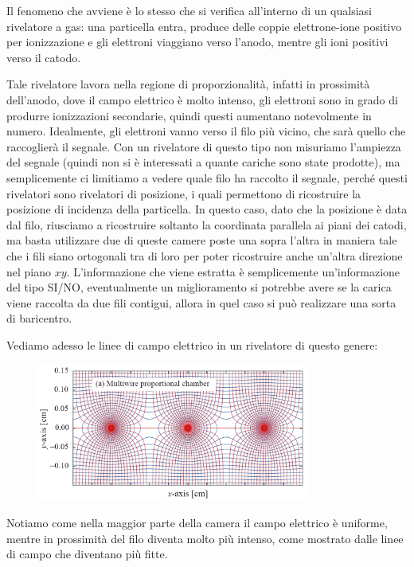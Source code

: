 \vspace{0.4cm}Il fenomeno che avviene è lo stesso che si verifica all'interno di un qualsiasi rivelatore a gas: una particella entra, produce delle coppie elettrone-ione positivo per ionizzazione e gli elettroni viaggiano verso l'anodo, mentre gli ioni positivi verso il catodo.

Tale rivelatore lavora nella regione di proporzionalità, infatti in prossimità dell'anodo, dove il campo elettrico è molto intenso, gli elettroni sono in grado di produrre ionizzazioni secondarie, quindi questi aumentano notevolmente in numero. Idealmente, gli elettroni vanno verso il filo più vicino, che sarà quello che raccoglierà il segnale. Con un rivelatore di questo tipo non misuriamo l'ampiezza del segnale (quindi non si è interessati a quante cariche sono state prodotte), ma semplicemente ci limitiamo a vedere quale filo ha raccolto il segnale, perché questi rivelatori sono rivelatori di posizione, i quali permettono di ricostruire la posizione di incidenza della particella. In questo caso, dato che la posizione è data dal filo, riusciamo a ricostruire soltanto la coordinata parallela ai piani dei catodi, ma basta utilizzare due di queste camere poste una sopra l'altra in maniera tale che i fili siano ortogonali tra di loro per poter ricostruire anche un'altra direzione nel piano $xy$. L'informazione che viene estratta è semplicemente un'informazione del tipo SI/NO, eventualmente un miglioramento si potrebbe avere se la carica viene raccolta da due fili contigui, allora in quel caso si può realizzare una sorta di baricentro.

Vediamo adesso le linee di campo elettrico in un rivelatore di questo genere:

\begin{figure}[H]
   \centering
   \includegraphics[width=0.8\textwidth]{immagini/campo_elettrico_MWPC.png}
\end{figure}

Notiamo come nella maggior parte della camera il campo elettrico è uniforme, mentre in prossimità del filo diventa molto più intenso, come mostrato dalle linee di campo che diventano più fitte. 

